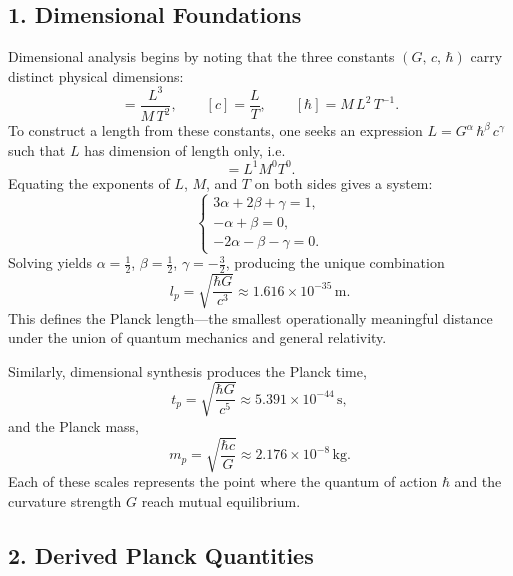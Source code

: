 \documentclass[11pt,oneside]{book}
\numberwithin{equation}{chapter}
\begin{document}
\subsection*{1. Dimensional Foundations}

Dimensional analysis begins by noting that the three constants $(G,\,c,\,\hbar)$ carry distinct physical dimensions:
\begin{equation}
[G] = \frac{L^3}{M\,T^2}, \qquad
[c] = \frac{L}{T}, \qquad
[\hbar] = M\,L^2\,T^{-1}.
\end{equation}
To construct a length from these constants, one seeks an expression $L = G^\alpha\,\hbar^\beta\,c^\gamma$ such that $L$ has dimension of length only, i.e.
\begin{equation}
[L] = L^1 M^0 T^0.
\end{equation}
Equating the exponents of $L$, $M$, and $T$ on both sides gives a system:
\begin{equation}
\begin{cases}
3\alpha + 2\beta + \gamma = 1,\\
-\alpha + \beta = 0,\\
-2\alpha - \beta - \gamma = 0.
\end{cases}
\end{equation}
Solving yields $\alpha=\tfrac{1}{2}$, $\beta=\tfrac{1}{2}$, $\gamma=-\tfrac{3}{2}$, producing the unique combination
\begin{equation}
l_p = \sqrt{\frac{\hbar G}{c^3}} \approx 1.616\times10^{-35}\,\mathrm{m}.
\end{equation}
This defines the Planck length—the smallest operationally meaningful distance under the union of quantum mechanics and general relativity.

Similarly, dimensional synthesis produces the Planck time,
\begin{equation}
t_p = \sqrt{\frac{\hbar G}{c^5}} \approx 5.391\times10^{-44}\,\mathrm{s},
\end{equation}
and the Planck mass,
\begin{equation}
m_p = \sqrt{\frac{\hbar c}{G}} \approx 2.176\times10^{-8}\,\mathrm{kg}.
\end{equation}
Each of these scales represents the point where the quantum of action $\hbar$ and the curvature strength $G$ reach mutual equilibrium.

\subsection*{2. Derived Planck Quantities}
\end{document}
